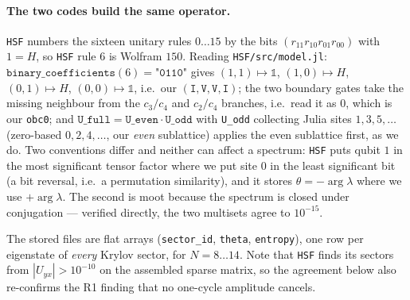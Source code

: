 \documentclass[11pt]{article}
\newcommand{\rt}[1]{\texttt{#1}}
\newcommand{\fn}[1]{\texttt{#1}}
\theoremstyle{plain}
\theoremstyle{definition}
\begin{document}
\paragraph{The two codes build the same operator.} \rt{HSF} numbers the sixteen
unitary rules $0\ldots15$ by the bits $(r_{11}r_{10}r_{01}r_{00})$ with $1=H$,
so \rt{HSF} rule $6$ is Wolfram $150$. Reading \fn{HSF/src/model.jl}:
$\texttt{binary\_coefficients}(6) = \texttt{"0110"}$ gives
$(1,1)\mapsto\mathbb{1}$, $(1,0)\mapsto H$, $(0,1)\mapsto H$,
$(0,0)\mapsto\mathbb{1}$, i.e.\ our $(\rt{I},\rt{V},\rt{V},\rt{I})$; the two
boundary gates take the missing neighbour from the $c_3/c_4$ and $c_2/c_4$
branches, i.e.\ read it as $0$, which is our \rt{obc0}; and
$\texttt{U\_full} = \texttt{U\_even}\cdot\texttt{U\_odd}$ with
\texttt{U\_odd} collecting Julia sites $1,3,5,\ldots$ (zero-based $0,2,4,\ldots$,
our \emph{even} sublattice) applies the even sublattice first, as we do. Two
conventions differ and neither can affect a spectrum: \rt{HSF} puts qubit $1$ in
the most significant tensor factor where we put site $0$ in the least
significant bit (a bit reversal, i.e.\ a permutation similarity), and it stores
$\theta = -\arg\lambda$ where we use $+\arg\lambda$. The second is moot because
the spectrum is closed under conjugation --- verified directly, the two
multisets agree to $10^{-15}$.

The stored files are flat arrays (\rt{sector\_id}, \rt{theta}, \rt{entropy}),
one row per eigenstate of \emph{every} Krylov sector, for $N=8\ldots14$. Note
that \rt{HSF} finds its sectors from $|U_{yx}|>10^{-10}$ on the assembled sparse
matrix, so the agreement below also re-confirms the R1 finding that no
one-cycle amplitude cancels.
\end{document}

